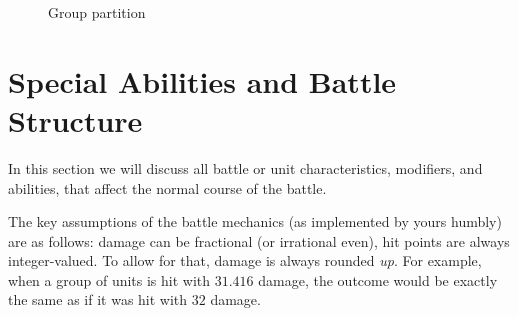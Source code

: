 \documentclass{article}
\numberwithin{equation}{section}
\begin{document}
{\begin{figure}[!ht]
    \begin{center}
    \caption{Group partition}
    \end{center}
\end{figure}

} %


\section{Special Abilities and Battle Structure}
In this section we will discuss all battle or unit characteristics, modifiers, and abilities, that affect the normal course of the battle.

The key assumptions of the battle mechanics (as implemented by yours humbly) are as follows: damage can be fractional (or irrational even), hit points are always integer-valued. To allow for that, damage is always rounded \emph{up}. For example, when a group of units is hit with $31.416$ damage, the outcome would be exactly the same as if it was hit with $32$ damage.
\end{document}
